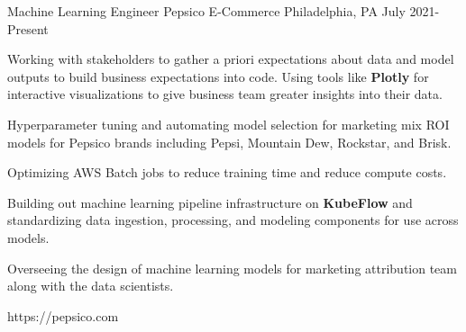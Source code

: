 
\begin{cventries}

\cventrylink
{Machine Learning Engineer}
{Pepsico E-Commerce}
{Philadelphia, PA}
{July 2021- Present}
{
\begin{cvitems}
\item{Working with stakeholders to gather a priori expectations about data and model outputs to build business expectations into code. Using tools like \textbf{Plotly} for interactive visualizations to give business team greater insights into their data.}
\item{Hyperparameter tuning and automating model selection for marketing mix ROI models for Pepsico brands including Pepsi, Mountain Dew, Rockstar, and Brisk.}
\item{Optimizing AWS Batch jobs to reduce training time and reduce compute costs.}
\item{Building out machine learning pipeline infrastructure on \textbf{KubeFlow} and standardizing data ingestion, processing, and modeling components for use across models.}
\item{Overseeing the design of machine learning models for marketing attribution team along with the data scientists.}
\end{cvitems}
}
{https://pepsico.com}




\end{cventries}
